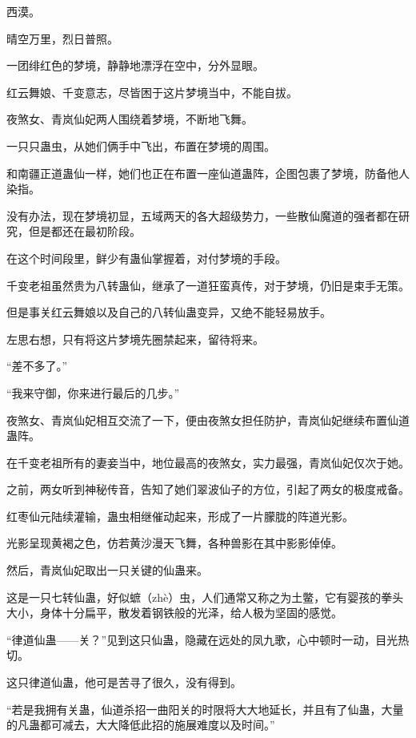 
\begin{this_body}



西漠。

晴空万里，烈日普照。

一团绯红色的梦境，静静地漂浮在空中，分外显眼。

红云舞娘、千变意志，尽皆困于这片梦境当中，不能自拔。

夜煞女、青岚仙妃两人围绕着梦境，不断地飞舞。

一只只蛊虫，从她们俩手中飞出，布置在梦境的周围。

和南疆正道蛊仙一样，她们也正在布置一座仙道蛊阵，企图包裹了梦境，防备他人染指。

没有办法，现在梦境初显，五域两天的各大超级势力，一些散仙魔道的强者都在研究，但是都还在最初阶段。

在这个时间段里，鲜少有蛊仙掌握着，对付梦境的手段。

千变老祖虽然贵为八转蛊仙，继承了一道狂蛮真传，对于梦境，仍旧是束手无策。

但是事关红云舞娘以及自己的八转仙蛊变异，又绝不能轻易放手。

左思右想，只有将这片梦境先圈禁起来，留待将来。

“差不多了。”

“我来守御，你来进行最后的几步。”

夜煞女、青岚仙妃相互交流了一下，便由夜煞女担任防护，青岚仙妃继续布置仙道蛊阵。

在千变老祖所有的妻妾当中，地位最高的夜煞女，实力最强，青岚仙妃仅次于她。

之前，两女听到神秘传音，告知了她们翠波仙子的方位，引起了两女的极度戒备。

红枣仙元陆续灌输，蛊虫相继催动起来，形成了一片朦胧的阵道光影。

光影呈现黄褐之色，仿若黄沙漫天飞舞，各种兽影在其中影影倬倬。

然后，青岚仙妃取出一只关键的仙蛊来。

这是一只七转仙蛊，好似蟅（zhè）虫，人们通常又称之为土鳖，它有婴孩的拳头大小，身体十分扁平，散发着钢铁般的光泽，给人极为坚固的感觉。

“律道仙蛊——关？”见到这只仙蛊，隐藏在远处的凤九歌，心中顿时一动，目光热切。

这只律道仙蛊，他可是苦寻了很久，没有得到。

“若是我拥有关蛊，仙道杀招一曲阳关的时限将大大地延长，并且有了仙蛊，大量的凡蛊都可减去，大大降低此招的施展难度以及时间。”


\end{this_body}
